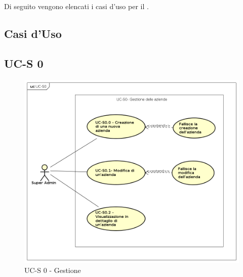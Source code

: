 \section{}

Di seguito vengono elencati i casi d'uso per il .

\newpage

\subsection{Casi d'Uso}

\subsection{UC-S 0}

    \begin{figure}[h]
      \begin{center}
        \includegraphics[width=12cm]{res/img/UCSuperadmin/UCS0.png}
      \caption{UC-S 0 - Gestione }
      \end{center} 
    \end{figure}    
    
